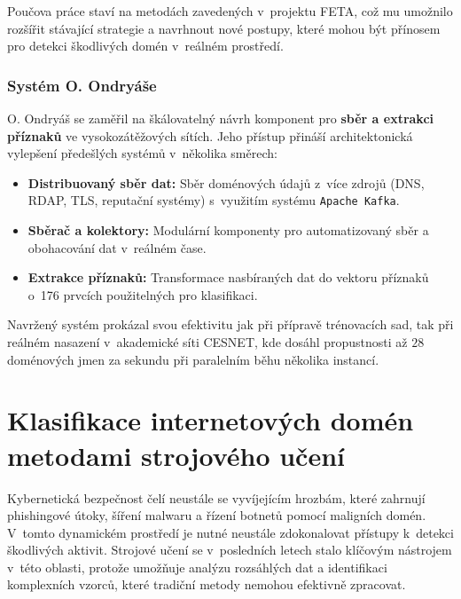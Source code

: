 \noindent Poučova práce staví na metodách zavedených v~projektu FETA, což mu umožnilo rozšířit stávající strategie a navrhnout nové postupy, které mohou být přínosem pro detekci škodlivých domén v~reálném prostředí.

\subsection{Systém O. Ondryáše}
O. Ondryáš \cite{oondra} se zaměřil na škálovatelný návrh komponent pro \textbf{sběr a extrakci příznaků} ve vysokozátěžových sítích. Jeho přístup přináší architektonická vylepšení předešlých systémů v~několika směrech:

\begin{itemize}
    \item \textbf{Distribuovaný sběr dat:} Sběr doménových údajů z~více zdrojů (DNS, RDAP, TLS, reputační systémy) s~využitím systému \texttt{Apache Kafka}.
    \item \textbf{Sběrač a kolektory:} Modulární komponenty pro automatizovaný sběr a obohacování dat v~reálném čase.
    \item \textbf{Extrakce příznaků:} Transformace nasbíraných dat do vektoru příznaků o~176 prvcích použitelných pro klasifikaci.
\end{itemize}

Navržený systém prokázal svou efektivitu jak při přípravě trénovacích sad, tak při reálném nasazení v~akademické síti CESNET, kde dosáhl propustnosti až $28$ doménových jmen za sekundu při paralelním běhu několika instancí.












\chapter{Klasifikace internetových domén metodami strojového učení}
\label{chapter:4}

Kybernetická bezpečnost čelí neustále se vyvíjejícím hrozbám, které zahrnují phishingové útoky, šíření malwaru a řízení botnetů pomocí maligních domén. V~tomto dynamickém prostředí je nutné neustále zdokonalovat přístupy k~detekci škodlivých aktivit. Strojové učení se v~posledních letech stalo klíčovým nástrojem v~této oblasti, protože umožňuje analýzu rozsáhlých dat a identifikaci komplexních vzorců, které tradiční metody nemohou efektivně zpracovat.

